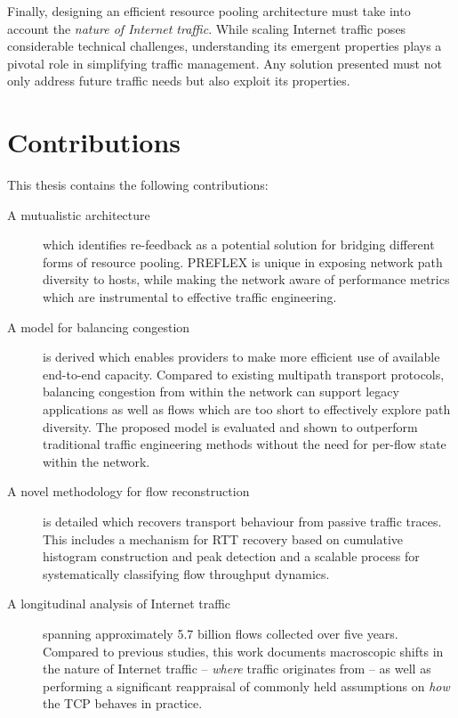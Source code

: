 Finally, designing an efficient resource pooling architecture must take into account the \emph{nature of Internet traffic}.
While scaling Internet traffic poses considerable technical challenges, understanding its emergent properties plays a pivotal role in simplifying traffic management.
Any solution presented must not only address future traffic needs but also exploit its properties.

\section{Contributions}

This thesis contains the following contributions:

\begin{description}
\item[A mutualistic architecture] which identifies re-feedback as a potential solution for bridging different forms of resource pooling.
\ac{PREFLEX} is unique in exposing network path diversity to hosts, while making the network aware of performance metrics which are instrumental to effective traffic engineering.
\item[A model for balancing congestion] is derived which enables providers to make more efficient use of available end-to-end capacity.
Compared to existing multipath transport protocols, balancing congestion from within the network can support legacy applications as well as flows which are too short to effectively explore path diversity.
The proposed model is evaluated and shown to outperform traditional traffic engineering methods without the need for per-flow state within the network.
\item[A novel methodology for flow reconstruction] is detailed which recovers transport behaviour from passive traffic traces.
This includes a mechanism for \ac{RTT} recovery based on cumulative histogram construction and peak detection and a scalable process for systematically classifying flow throughput dynamics.
\item[A longitudinal analysis of Internet traffic] spanning approximately 5.7 billion flows collected over five years.
Compared to previous studies, this work documents macroscopic shifts in the nature of Internet traffic -- \emph{where} traffic originates from -- as well as performing a significant reappraisal of commonly held assumptions on \emph{how} the \acf{TCP} behaves in practice.

\end{description}
